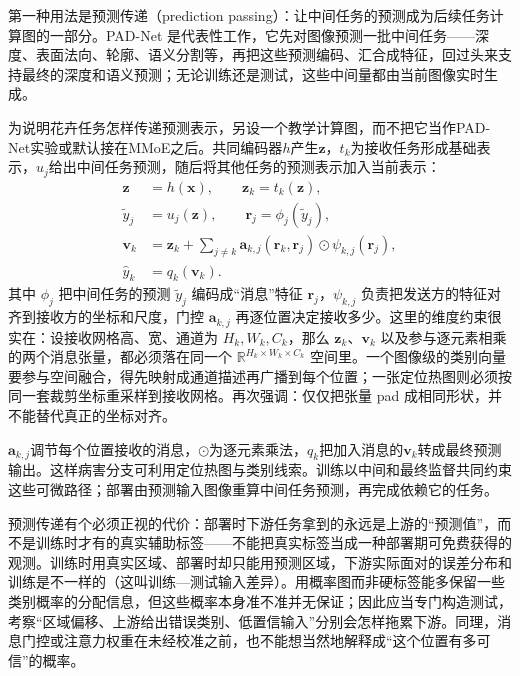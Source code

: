 第一种用法是预测传递（prediction passing）：让中间任务的预测成为后续任务计算图的一部分。PAD-Net 是代表性工作，它先对图像预测一批中间任务——深度、表面法向、轮廓、语义分割等，再把这些预测编码、汇合成特征，回过头来支持最终的深度和语义预测；无论训练还是测试，这些中间量都由当前图像实时生成。

为说明花卉任务怎样传递预测表示，另设一个教学计算图，而不把它当作PAD-Net实验或默认接在MMoE之后。共同编码器$h$产生$\bm z$，$t_k$为接收任务形成基础表示，$u_j$给出中间任务预测，随后将其他任务的预测表示加入当前表示：
\begin{align}
  \bm z&=h(\bm x),
  \qquad \bm z_k=t_k(\bm z),
  \nonumber\\
  \widetilde y_j&=u_j(\bm z),
  \qquad
  \bm r_j=\phi_j(\widetilde y_j),
  \nonumber\\
  \bm v_k&=\bm z_k+
     \sum_{j\ne k}
     \bm a_{k,j}(\bm r_k,\bm r_j)
       \odot\psi_{k,j}(\bm r_j),
  \nonumber\\
  \hat y_k&=q_k(\bm v_k).
  \label{eq:ket-sharing-output-message}
\end{align}
其中 $\phi_j$ 把中间任务的预测 $\widetilde y_j$ 编码成“消息”特征 $\bm r_j$，$\psi_{k,j}$ 负责把发送方的特征对齐到接收方的坐标和尺度，门控 $\bm a_{k,j}$ 再逐位置决定接收多少。这里的维度约束很实在：设接收网格高、宽、通道为 $H_k,W_k,C_k$，那么 $\bm z_k$、$\bm v_k$ 以及参与逐元素相乘的两个消息张量，都必须落在同一个 $\mathbb R^{H_k\times W_k\times C_k}$ 空间里。一个图像级的类别向量要参与空间融合，得先映射成通道描述再广播到每个位置；一张定位热图则必须按同一套裁剪坐标重采样到接收网格。再次强调：仅仅把张量 pad 成相同形状，并不能替代真正的坐标对齐。

$\bm a_{k,j}$调节每个位置接收的消息，$\odot$为逐元素乘法，$q_k$把加入消息的$\bm v_k$转成最终预测输出。这样病害分支可利用定位热图与类别线索。训练以中间和最终监督共同约束这些可微路径；部署由预测输入图像重算中间任务预测，再完成依赖它的任务。

预测传递有个必须正视的代价：部署时下游任务拿到的永远是上游的“预测值”，而不是训练时才有的真实辅助标签——不能把真实标签当成一种部署期可免费获得的观测。训练时用真实区域、部署时却只能用预测区域，下游实际面对的误差分布和训练是不一样的（这叫训练—测试输入差异）。用概率图而非硬标签能多保留一些类别概率的分配信息，但这些概率本身准不准并无保证；因此应当专门构造测试，考察“区域偏移、上游给出错误类别、低置信输入”分别会怎样拖累下游。同理，消息门控或注意力权重在未经校准之前，也不能想当然地解释成“这个位置有多可信”的概率。

